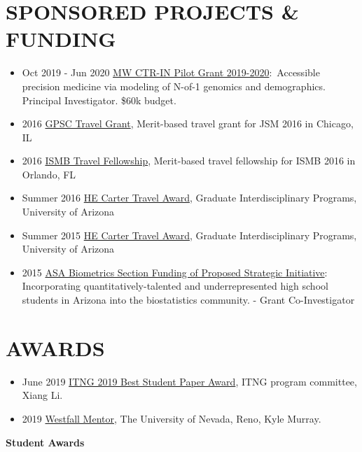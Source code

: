 \documentclass[paper=a4,fontsize=11pt]{scrartcl} %
\newcommand{\NewPart}[2]{\section*{\uppercase{#1} #2 }}
\begin{document}

\NewPart{Sponsored Projects \& Funding}{}
\vspace{-7pt}

\begin{itemize}[noitemsep]
      \item Oct 2019 - Jun 2020 \href{http://ctrin.unlv.edu/about/}{MW CTR-IN Pilot Grant 2019-2020}:~Accessible precision medicine via modeling of N-of-1 genomics and demographics. Principal Investigator. \$60k budget.
\item 2016 \href{http://gpsc.arizona.edu/travel-grants}{GPSC Travel Grant}, Merit-based travel grant for JSM 2016 in Chicago, IL
\item 2016 \href{https://www.iscb.org/ismb2016-submission/ismb2016-travel-fellowship-2}{ISMB Travel Fellowship}, Merit-based travel fellowship for ISMB 2016 in Orlando, FL
\item Summer 2016 \href{https://gidp.arizona.edu/carter-travel-award/award-recipients}{HE Carter Travel Award}, Graduate Interdisciplinary Programs, University of Arizona 
\item Summer 2015 \href{https://gidp.arizona.edu/carter-travel-award/award-recipients}{HE Carter Travel Award}, Graduate Interdisciplinary Programs, University of Arizona 
\item 2015 \href{http://stattrak.amstat.org/2014/03/01/grant-opportunity}{ASA Biometrics Section Funding of Proposed Strategic Initiative}:  Incorporating quantitatively-talented and underrepresented high school students in Arizona into the biostatistics community. - Grant Co-Investigator
\end{itemize}


\NewPart{Awards}{}
\vspace{-7pt}

\begin{itemize}[noitemsep]
      \item June 2019 \href{https://http://www.itng.info/}{ITNG 2019 Best Student Paper Award}, ITNG program committee, Xiang Li.
    \item 2019 \href{https://www.unr.edu/science/student-resources/student-competitions-awards}{Westfall Mentor}, The University of Nevada, Reno, Kyle Murray.
\end{itemize}

\textbf{Student Awards}
\end{document}
